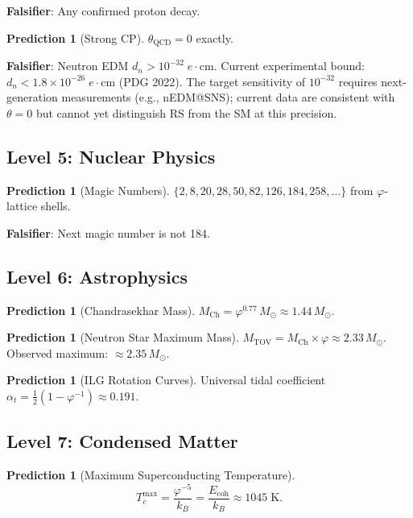 \documentclass[12pt,a4paper]{article}
\theoremstyle{definition}
\newtheorem{prediction}[theorem]{Prediction}
\theoremstyle{remark}
\begin{document}
\textbf{Falsifier}: Any confirmed proton decay.

\begin{prediction}[Strong CP]
$\theta_{\mathrm{QCD}} = 0$ exactly.
\end{prediction}

\textbf{Falsifier}: Neutron EDM $d_n > 10^{-32}\;e\cdot\mathrm{cm}$.
Current experimental bound: $d_n < 1.8 \times 10^{-26}\;e\cdot\mathrm{cm}$
(PDG 2022).  The target sensitivity of $10^{-32}$ requires next-generation
measurements (e.g., nEDM@SNS); current data are consistent with $\theta = 0$
but cannot yet distinguish RS from the SM at this precision.

\subsection{Level 5: Nuclear Physics}

\begin{prediction}[Magic Numbers]
$\{2, 8, 20, 28, 50, 82, 126, 184, 258, \ldots\}$ from $\varphi$-lattice
shells.
\end{prediction}

\textbf{Falsifier}: Next magic number is not 184.

\subsection{Level 6: Astrophysics}

\begin{prediction}[Chandrasekhar Mass]
$M_{\mathrm{Ch}} = \varphi^{0.77}\,M_\odot \approx 1.44\,M_\odot$.
\end{prediction}

\begin{prediction}[Neutron Star Maximum Mass]
$M_{\mathrm{TOV}} = M_{\mathrm{Ch}} \times \varphi \approx
2.33\,M_\odot$.  Observed maximum: $\approx 2.35\,M_\odot$.
\end{prediction}

\begin{prediction}[ILG Rotation Curves]
Universal tidal coefficient $\alpha_t = \tfrac{1}{2}(1 -
\varphi^{-1}) \approx 0.191$.
\end{prediction}

\subsection{Level 7: Condensed Matter}

\begin{prediction}[Maximum Superconducting Temperature]
\begin{equation}
  T_c^{\max} = \frac{\varphi^{-5}}{k_B} =
  \frac{E_{\mathrm{coh}}}{k_B} \approx 1045\;\mathrm{K}.
\end{equation}
\end{prediction}
\end{document}
